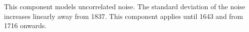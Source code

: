 This component models uncorrelated noise.
The standard deviation of the noise increases linearly away from 1837.
This component applies until 1643 and from 1716 onwards.